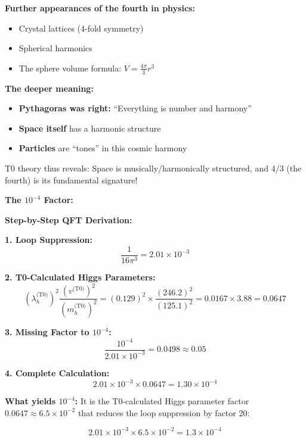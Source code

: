 \documentclass[12pt,a4paper]{report}
\begin{document}
\textbf{Further appearances of the fourth in physics:}
\begin{itemize}
	\item Crystal lattices (4-fold symmetry)
	\item Spherical harmonics
	\item The sphere volume formula: $V = \frac{4\pi}{3}r^3$
\end{itemize}

\textbf{The deeper meaning:}
\begin{itemize}
	\item \textbf{Pythagoras was right:} ``Everything is number and harmony''
	\item \textbf{Space itself} has a harmonic structure
	\item \textbf{Particles} are ``tones'' in this cosmic harmony
\end{itemize}

T0 theory thus reveals: Space is musically/harmonically structured, and 4/3 (the fourth) is its fundamental signature!

\textbf{The $10^{-4}$ Factor:}

\textbf{Step-by-Step QFT Derivation:}

\textbf{1. Loop Suppression:}
\begin{equation}
	\frac{1}{16\pi^3} = 2.01 \times 10^{-3}
\end{equation}

\textbf{2. T0-Calculated Higgs Parameters:}
\begin{equation}
	(\lambda_h^{\text{(T0)}})^2 \frac{(v^{\text{(T0)}})^2}{(m_h^{\text{(T0)}})^2} = (0.129)^2 \times \frac{(246.2)^2}{(125.1)^2} = 0.0167 \times 3.88 = 0.0647
\end{equation}

\textbf{3. Missing Factor to $10^{-4}$:}
\begin{equation}
	\frac{10^{-4}}{2.01 \times 10^{-3}} = 0.0498 \approx 0.05
\end{equation}

\textbf{4. Complete Calculation:}
\begin{equation}
	2.01 \times 10^{-3} \times 0.0647 = 1.30 \times 10^{-4}
\end{equation}

\textbf{What yields $10^{-4}$:}
It is the T0-calculated Higgs parameter factor $0.0647 \approx 6.5 \times 10^{-2}$ that reduces the loop suppression by factor 20:

\begin{equation}
	2.01 \times 10^{-3} \times 6.5 \times 10^{-2} = 1.3 \times 10^{-4}
\end{equation}
\end{document}
